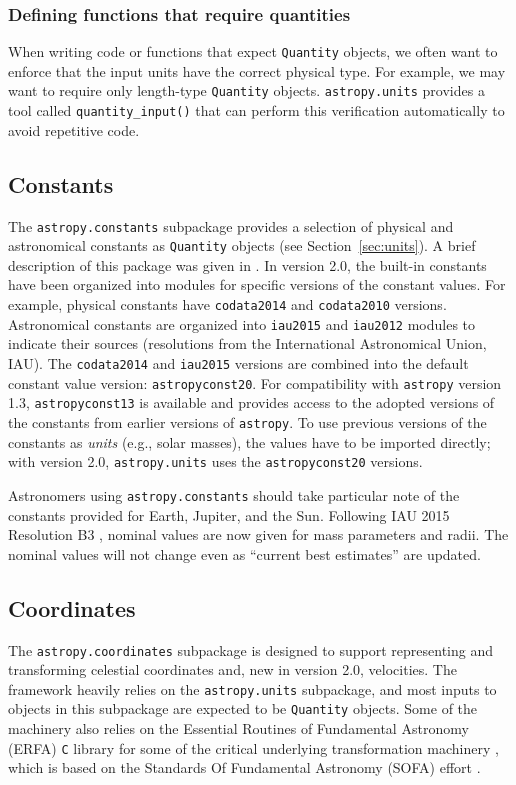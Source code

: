 \documentclass[modern]{aastex62}
\newcommand{\package}[1]{\texttt{#1}\xspace}
\newcommand{\astropypkg}{\package{astropy}}
\newcommand{\sectionname}{Section\xspace}
\begin{document}
\subsubsection{Defining functions that require quantities}
        When writing code or
        functions that expect \texttt{Quantity} objects, we often want to
        enforce that the input units have the correct physical type.
        For example, we may want to require only length-type \texttt{Quantity}
        objects.
        \texttt{astropy.units} provides a tool called \texttt{quantity\_input()}
        that can perform this verification automatically to avoid repetitive
        code.


\subsection{Constants}

The \texttt{astropy.constants} subpackage provides a selection of physical and
astronomical constants as \texttt{Quantity} objects (see
\sectionname~\ref{sec:units}).
A brief description of this package was given in \cite{astropy}.
In version 2.0, the built-in constants have been organized into modules for
specific versions of the constant values.
For example, physical constants have \texttt{codata2014} \citep{codata2014} and
\texttt{codata2010} versions.
Astronomical constants are organized into \texttt{iau2015} and \texttt{iau2012}
modules to indicate their sources (resolutions from the International
Astronomical Union, IAU).
The \texttt{codata2014} and \texttt{iau2015} versions are combined into the
default constant value version: \texttt{astropyconst20}.
For compatibility with \astropypkg version 1.3,  \texttt{astropyconst13}
is available and provides access to the adopted versions of the
constants from earlier versions of \astropypkg.
To use previous versions of the constants as \emph{units} (e.g., solar masses),
the values have to be imported directly; with version
2.0, \texttt{astropy.units} uses the \texttt{astropyconst20} versions.

Astronomers using \texttt{astropy.constants} should take particular note of the
constants provided for Earth, Jupiter, and the Sun.
Following IAU 2015 Resolution B3 \citep{iau2015b3}, nominal values are now given
for mass parameters and radii.
The nominal values will not change even as ``current best estimates'' are
updated.

\subsection{Coordinates}
\label{sec:coordinates}
The \package{astropy.coordinates} subpackage is designed to support representing
and transforming celestial coordinates and, new in version 2.0, velocities.
The framework heavily relies on the \package{astropy.units} subpackage, and most
inputs to objects in this subpackage are expected to be \texttt{Quantity}
objects.
Some of the machinery also relies on the Essential Routines of Fundamental
Astronomy (ERFA) \texttt{C} library for some of the critical underlying
transformation machinery \citep{erfa}, which is based on the Standards Of
Fundamental Astronomy (SOFA) effort \citep{sofa}.
\end{document}
